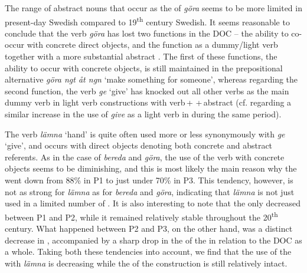 \documentclass[output=paper]{langscibook}
\begin{document}
The range of abstract nouns that occur as the  of \textit{göra} seems to be more limited in present-day Swedish compared to 19\textsuperscript{th} century Swedish. It seems reasonable to conclude that the verb \textit{göra} has lost two functions in the DOC – the ability to co-occur with concrete direct objects, and the function as a dummy/light verb together with a more substantial abstract . The first of these functions, the ability to occur with concrete objects, is still maintained in the prepositional alternative \textit{göra ngt åt ngn} ‘make something for someone’, whereas regarding the second function, the verb \textit{ge} ‘give’ has knocked out all other verbs as the main dummy verb in light verb constructions with verb\,+\,\,+\,abstract  (cf. \citealt{Sundquist2020} regarding a similar increase in the use of \textit{give} as a light verb in  during the same period).



\label{sec:valdeson:5.3.1.3}



The verb \textit{lämna} ‘hand’ is quite often used more or less synonymously with \textit{ge} ‘give’, and occurs with direct objects denoting both concrete and abstract referents. As in the case of \textit{bereda} and \textit{göra}, the use of the verb with concrete objects seems to be diminishing, and this is most likely the main reason why the  went down from 88\% in P1 to just under 70\% in P3. This tendency, however, is not as strong for \textit{lämna} as for \textit{bereda} and \textit{göra}, indicating that \textit{lämna} is not just used in a limited number of . It is also interesting to note that the  only decreased between P1 and P2, while it remained relatively stable throughout the 20\textsuperscript{th} century. What happened between P2 and P3, on the other hand, was a distinct decrease in , accompanied by a sharp drop in the  of the  in relation to the DOC as a whole. Taking both these tendencies into account, we find that the use of the  with \textit{lämna} is decreasing while the  of the construction is still relatively intact.
\end{document}
